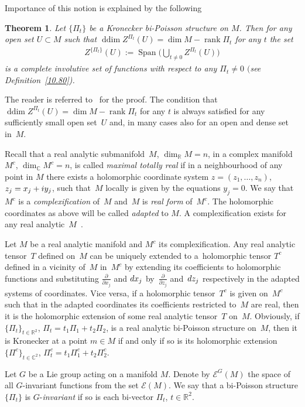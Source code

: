 \documentclass[11pt]{article}
\numberwithin{equation}{section}
\newtheorem{Theorem}{Theorem}[section]
\begin{document}
Importance of this notion is explained by the following

\begin{Theorem}\label{prop}Let $\{\Pi_t\}$ be a Kronecker bi-Poisson structure on $M$. Then for any open set $U \subset M$ such that $\operatorname{ddim} Z^{\Pi_t}(U)=\dim M-\operatorname{rank} \Pi_t$ for any $t$ the set
\begin{gather*}
Z^{\{\Pi_t\}}(U):=\operatorname{Span}\bigg(\bigcup_{t\not=0}Z^{\Pi_t}(U)\bigg)
\end{gather*}
is a complete involutive set of functions with respect to any $\Pi_t\not =0$ $($see Definition~{\rm \ref{10.80})}.
\end{Theorem}
The reader is referred to~\cite{bols'} for the proof. The condition that $\operatorname{ddim} Z^{\Pi_t}(U)=\dim M-\operatorname{rank} \Pi_t$ for any $t$ is always satisfied for any sufficiently small open set~$U$ and, in many cases also for an open and dense set in~$M$.

\begin{Remark}\label{rem}Recall that a real analytic submanifold~$M$, $\dim_\mathbb{R} M=n$, in a complex manifold~${M}^c$, $\dim_\mathbb{C}{M}^c=n$, is called \emph{maximal totally real} if in a neighbourhood of any point in $M$ there exists a holomorphic coordinate system $z=(z_1,\dots,z_n)$, $z_j=x_j+{\rm i}y_j$, such that~$M$ locally is given by the equations $y_j=0$. We say that ${M}^c$ is a \emph{complexification} of~$M$ and~$M$ is \emph{real form} of~${M}^c$. The holomorphic coordinates as above will be called \emph{adapted} to $M$. A complexification exists for any real analytic~$M$~\cite{bw}.

Let $M$ be a real analytic manifold and ${M}^c$ its complexification. Any real analytic tensor~$T$ defined on~$M$ can be uniquely extended to a~holomorphic tensor ${T}^c$ defined in a vicinity of~$M$ in~${M}^c$ by extending its coefficients to holomorphic functions and substituting $\frac{\partial }{\partial x_j}$ and ${\rm d}x_j$ by~$\frac{\partial }{\partial z_j}$ and~${\rm d}z_j$ respectively in the adapted systems of coordinates. Vice versa, if a holomorphic tensor~${T}^c$ is given on~${M}^c$ such that in the adapted coordinates its coefficients restricted to~$M$ are real, then it is the holomorphic extension of some real analytic tensor~$T$ on~$M$. Obviously, if $\{\Pi_t\}_{t\in\mathbb{R}^2}$, $\Pi_t=t_1\Pi_1+t_2\Pi_2$, is a real analytic bi-Poisson structure on~$M$, then it is Kronecker at a point $m\in M$ if and only if so is its holomorphic extension $\{{\Pi}^c\}_{t\in\mathbb{C}^2}$, ${\Pi}^c_t=t_1{\Pi}^c_1+t_2 {\Pi}^c_2$.

\end{Remark}Let $G$ be a Lie group acting on a manifold $M$. Denote by $\mathcal{E}^G(M)$ the space of all $G$-invariant functions from the set ${\mathcal E}(M)$. We say that a bi-Poisson structure $\{\Pi_t\}$ is $G$-\emph{invariant} if so is each bi-vector $\Pi_t$, $t\in\mathbb{R}^2$.
\end{document}

